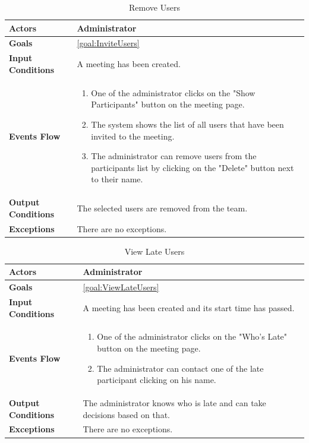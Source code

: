 \begin{table}[H]
	\centering
	\def\arraystretch{1.5}
	\begin{tabular}{|m{7cm}|m{7cm}|}
		\hline
		\textbf{Actors}            & Administrator    \\ \hline
		\textbf{Goals}             & \ref{goal:InviteUsers}           \\ \hline
		\textbf{Input Conditions}  & A meeting has been created.           \\ \hline
		\textbf{Events Flow}       & 
		\begin{enumerate}[topsep=0pt, leftmargin=*]
			\item One of the administrator clicks on the "Show Participants" button on the meeting page.
			\item The system shows the list of all users that have been invited to the meeting.
			\item The administrator can remove users from the participants list by clicking on the "Delete" button next to their name.
		\end{enumerate}            \\ \hline
		\textbf{Output Conditions} & The selected users are removed from the team.            \\ \hline
		\textbf{Exceptions}        & 
		There are no exceptions.         \\ \hline
	\end{tabular}
	\caption{Remove Users\label{UseCaseDescr:RemoveUsers}}
\end{table}

\begin{table}[H]
	\centering
	\def\arraystretch{1.5}
	\begin{tabular}{|m{7cm}|m{7cm}|}
		\hline
		\textbf{Actors}            & Administrator    \\ \hline
		\textbf{Goals}             & \ref{goal:ViewLateUsers}           \\ \hline
		\textbf{Input Conditions}  & A meeting has been created and its start time has passed.         \\ \hline
		\textbf{Events Flow}       &  
		\begin{enumerate}[topsep=0pt, leftmargin=*]
			\item One of the administrator clicks on the "Who's Late" button on the meeting page.
			\item The administrator can contact one of the late participant clicking on his name.
		\end{enumerate}             \\ \hline
		\textbf{Output Conditions} & The administrator knows who is late and can take decisions based on that.           \\ \hline
		\textbf{Exceptions}        & There are no exceptions.           \\ \hline
	\end{tabular}
	\caption{View Late Users\label{UseCaseDescr:LateUsers}}
\end{table}

